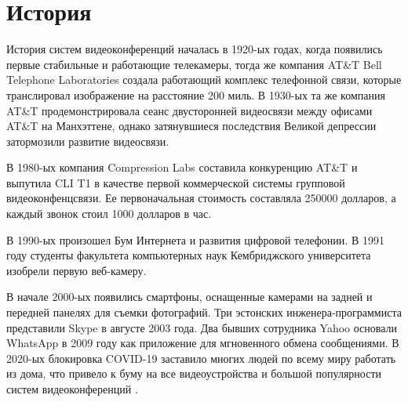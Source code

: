 \section{История}

История систем видеоконференций началась в 1920-ых годах, когда появились первые стабильные и работающие телекамеры, тогда же компания AT\&T Bell Telephone Laboratories создала работающий комплекс телефонной связи, которые транслировал изображение на расстояние 200 миль. В 1930-ых та же компания AT\&T продемонстрировала сеанс двусторонней видеосвязи между офисами AT\&T на Манхэттене, однако затянувшиеся последствия Великой депрессии затормозили развитие видеосвязи.

В 1980-ых компания Compression Labs составила конкуренцию AT\&T и выпутила CLI T1 в качестве первой коммерческой системы групповой видеоконфенцсвязи. Ее первоначальная стоимость составляла 250000 долларов, а каждый звонок стоил 1000 долларов в час.

В 1990-ых произошел Бум Интернета и развития цифровой телефонии. В 1991 году студенты факультета компьютерных наук Кембриджского университета изобрели первую веб-камеру.

В начале 2000-ых появились смартфоны, оснащенные камерами на задней и передней панелях для съемки фотографий. Три эстонских инженера-программиста представили Skype в августе 2003 года. Два бывших сотрудника Yahoo основали WhatsApp в 2009 году как приложение для мгновенного обмена сообщениями. В 2020-ых блокировка COVID-19 заставило многих людей по всему миру работать из дома, что привело к буму на все видеоустройства и большой популярности систем видеоконференций \cite{v1}.

\pagebreak